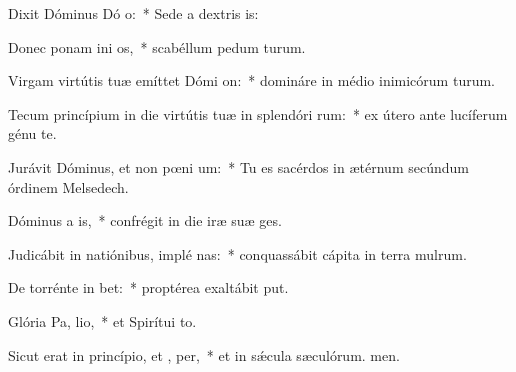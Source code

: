 \item Dixit Dóminus Dó o:~* Sede a dextris is:
\item Donec ponam ini os,~* scabéllum pedum turum.
\item Virgam virtútis tuæ emíttet Dómi  on:~* domináre in médio inimicórum turum.
\item Tecum princípium in die virtútis tuæ in splendóri rum:~* ex útero ante lucíferum génu te.
\item Jurávit Dóminus, et non pœni um:~* Tu es sacérdos in ætérnum secúndum órdinem Melsedech.
\item Dóminus a  is,~* confrégit in die iræ suæ ges.
\item Judicábit in natiónibus, implé nas:~* conquassábit cápita in terra mulrum.
\item De torrénte in  bet:~* proptérea exaltábit put.
\item Glória Pa,  lio,~* et Spirítui to.
\item Sicut erat in princípio, et ,  per,~* et in sǽcula sæculórum. men.
